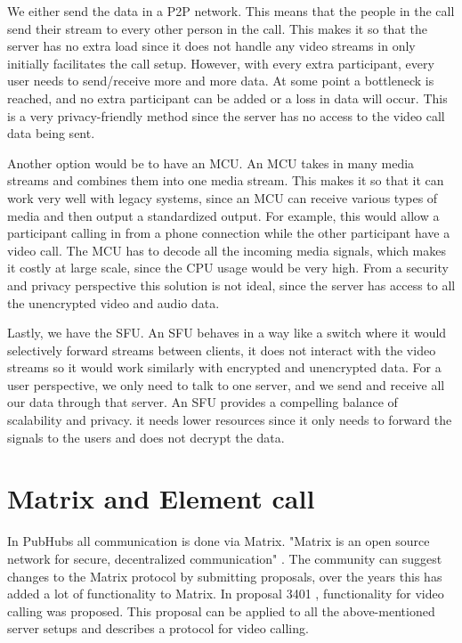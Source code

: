 \documentclass[11pt,a4paper]{article}
\begin{document}
We either send the data in a P2P network. This means that the people in the call send their stream to every other person in the call. This makes it so that the server has no extra load since it does not handle any video streams in only initially facilitates the call setup. However, with every extra participant, every user needs to send/receive more and more data. At some point a bottleneck is reached, and no extra participant can be added or a loss in data will occur. This is a very privacy-friendly method since the server has no access to the video call data being sent.

Another option would be to have an MCU. An MCU takes in many media streams and combines them into one media stream. This makes it so that it can work very well with legacy systems, since an MCU can receive various types of media and then output a standardized output. For example, this would allow a participant calling in from a phone connection while the other participant have a video call. The MCU has to decode all the incoming media signals, which makes it costly at large scale, since the CPU usage would be very high. From a security and privacy perspective this solution is not ideal, since the server has access to all the unencrypted video and audio data.

Lastly, we have the SFU. An SFU behaves in a way like a switch where it would selectively forward streams between clients, it does not interact with the video streams so it would work similarly with encrypted and unencrypted data. For a user perspective, we only need to talk to one server, and we send and receive all our data through that server. An SFU provides a compelling balance of scalability and privacy. it needs lower resources since it only needs to forward the signals to the users and does not decrypt the data. 

\section{Matrix and Element call}
In PubHubs all communication is done via Matrix. "Matrix is an open source network for secure, decentralized communication" \cite{MATRIX}. The community can suggest changes to the Matrix protocol by submitting proposals, over the years this has added a lot of functionality to Matrix. In proposal 3401 \cite{MATRIX_VIDEO_CALL_PROP}, functionality for video calling was proposed. This proposal can be applied to all the above-mentioned server setups and describes a protocol for video calling. 
\end{document}
